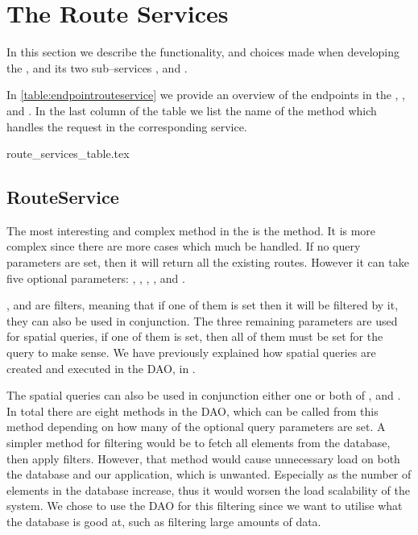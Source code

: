 \section{The Route Services}
In this section we describe the functionality, and choices made when developing the ,
and its two sub--services , and .

In \cref{table:endpointrouteservice} we provide an overview of the endpoints in the , , and .
In the last column of the table we list the name of the method which handles the request in the corresponding service.

{route_services_table.tex}

\subsection{RouteService}\label{subsec:routeservice}
The most interesting and complex method in the  is the  method.
It is more complex since there are more cases which much be handled.
If no query parameters are set, then it will return all the existing routes.
However it can take five optional parameters: , , , , and .

, and  are filters, meaning that if one of them is set then it will be filtered by it,
they can also be used in conjunction.
The three remaining parameters are used for spatial queries, if one of them is set, then all of them must be set for the query to make sense.
We have previously explained how spatial queries are created and executed in the \ac{DAO}, in .

The spatial queries can also be used in conjunction either one or both of , and .
In total there are eight methods in the \ac{DAO}, which can be called from this method depending on how many of the optional query parameters are set.
A simpler method for filtering would be to fetch all elements from the database, then apply filters.
However, that method would cause unnecessary load on both the database and our application, which is unwanted.
Especially as the number of elements in the database increase, thus it would worsen the load scalability of the system.
We chose to use the \ac{DAO} for this filtering since we want to utilise what the database is good at, such as filtering large amounts of data.

